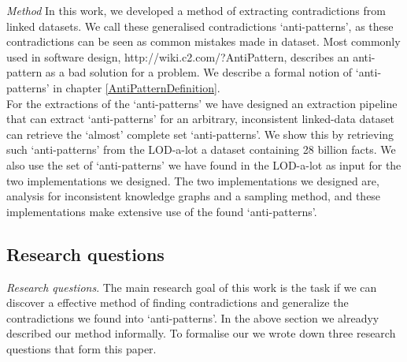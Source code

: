 \documentclass{article}
\begin{document}
\textit{Method} In this work, we developed a method of extracting contradictions from linked datasets. We call these generalised contradictions `anti-patterns', as these contradictions can be seen as common mistakes made in dataset. Most commonly used in software design, http://wiki.c2.com/?AntiPattern, describes an anti-pattern as a bad solution for a problem. We describe a formal notion of `anti-patterns' in chapter \ref{AntiPatternDefinition}.\\

For the extractions of the `anti-patterns' we have designed an extraction pipeline that can extract `anti-patterns' for an arbitrary, inconsistent linked-data dataset can retrieve the `almost' complete set `anti-patterns'. We show this by retrieving such `anti-patterns' from the LOD-a-lot\cite{JavierD:2017} a dataset containing 28 billion facts. We also use the set of `anti-patterns' we have found in the LOD-a-lot as input for the two implementations we designed. The two implementations we designed are, analysis for inconsistent knowledge graphs and a sampling method, and these implementations make extensive use of the found `anti-patterns'. 

\subsection{Research questions}
\textit{Research questions}. The main research goal of this work is the task if we can discover a effective method of finding contradictions and generalize the contradictions we found into `anti-patterns'. In the above section we alreadyy described our method informally. To formalise our we wrote down three research questions that form this paper.
\end{document}
